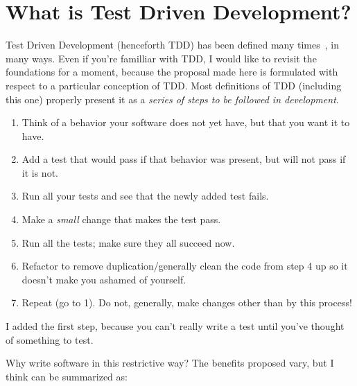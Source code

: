 \documentclass[sigplan,screen]{acmart}
\begin{document}
\section{What is Test Driven Development?}

Test Driven Development (henceforth TDD) has been defined many times~\cite{beck2002test,astels2003test,TDDIBM,TDDAcademy},
in many ways.  Even if you're familliar with TDD, I would like to
revisit the foundations for a moment, because the proposal made here
is formulated with respect to a particular conception of TDD.  Most
definitions of TDD (including this one) properly present it as a
\emph{series of steps to be followed in development}.

\begin{enumerate}
  \item Think of a behavior your software does not yet have,
    but that you want it to have.
    \item Add a test that would pass if that behavior was present, but
      will not pass if it is not.
    \item Run all your tests and see that the newly added test fails.
    \item Make a \emph{small} change that makes the test pass.
    \item Run all the tests; make sure they all succeed now.
      \item Refactor to remove duplication/generally clean the code
        from step 4 up so it doesn't make you ashamed of yourself.
        \item Repeat (go to 1).  Do not, generally, make changes other than by
          this process!
      \end{enumerate}

I added the first step, because you can't really write a test until
you've thought of something to test.

Why write software in this restrictive way?  The benefits proposed
vary, but I think can be summarized as:
\end{document}
